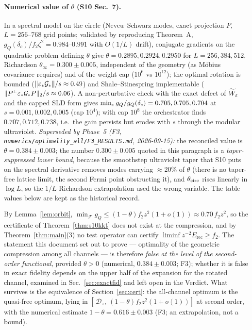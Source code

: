 \documentclass[11pt,a4paper]{article}
\newcommand{\Erec}{E_{\mathrm{rec}}}\newcommand{\Krec}{\mathcal K_{\mathrm{rec}}}
\begin{document}
\paragraph{Numerical value of \(\theta\) (S10 Sec.~7).}  In a spectral model on the circle
(Neveu--Schwarz modes, exact projection \(P\), \(L=256\)--\(768\) grid points; validated by reproducing
Theorem~A, \(g_Q(\delta_c)/f_2\zeta^2=0.984\)--\(0.991\) with \(O(1/L)\) drift), conjugate gradients on
the quadratic problem defining \(\theta\) give \(\theta=0.2895,0.2924,0.2950\) for \(L=256,384,512\),
Richardson \(\theta_\infty=0.300\pm0.005\), independent of the geometry (as M\"obius covariance
requires) and of the weight cap (\(10^6\) vs \(10^{12}\)); the optimal rotation is bounded
(\(\|\varepsilon_*\mathcal G_*\|/s\approx0.49\)) and Shale--Stinespring implementable
(\(\|P^\perp\varepsilon_*\mathcal G_*P\|_2/s\approx0.06\)).  A non-perturbative check with the exact defect of
\(\widetilde W_{\varepsilon}\) and the capped SLD form gives \(\min_\varepsilon g_Q/g_Q(\delta_c)=0.705,0.705,0.704\) at
\(s=0.001,0.002,0.005\) (cap \(10^4\)); with cap \(10^8\) the orchestrator finds \(0.707,0.712,0.738\),
i.e.\ the gain persists but erodes with \(s\) through the modular ultraviolet.
\emph{Superseded by Phase~5 (F3, \texttt{numerics/optimality\_all/F3\_RESULTS.md}, 2026-09-15):}
the reconciled value is \(\theta=0.384\pm0.003\); the number \(0.300\pm0.005\) quoted in this
paragraph is a \emph{taper-suppressed lower bound}, because the smoothstep ultraviolet taper that
S10 puts on the spectral derivative removes modes carrying \(\approx20\%\) of \(\theta\) (there is
no taper-free lattice limit, the second Fermi point obstructing it), and \(\theta_{\rm circ}\) rises
linearly in \(\log L\), so the \(1/L\) Richardson extrapolation used the wrong variable.  The table
values below are kept as the historical record.

\begin{verdictbreak}
By Lemma~\ref{lem:orbit}, \(\min_{\mathcal F}g_Q\le(1-\theta)f_2z^2(1+o(1))\approx0.70\,f_2z^2\), so the
certificate of Theorem~\ref{thm:s10kkt} does not exist at the compression, and by
Theorem~\ref{thm:main}(3) no test operator can certify \(\liminf z^{-2}\Erec\ge f_2\).  The
statement this document set out to prove --- optimality of the geometric compression among all
channels --- is therefore \emph{false at the level of the second-order functional}, provided
\(\theta>0\) (numerical, \(0.384\pm0.003\); F3); whether it is false in exact fidelity depends on the upper half of
the expansion for the rotated channel, examined in Sec.~\ref{sec:exactfid} and left open in the
Verdict.  What survives is the equivalence of Section~\ref{sec:cert}: the
all-channel optimum is the quasi-free optimum, lying in \([\,\mathcal D_z,\ (1-\theta)f_2z^2(1+o(1))]\) at second order, with the numerical estimate \(1-\theta=0.616\pm0.003\) (F3; an extrapolation, not a bound).
\end{verdictbreak}
\end{document}
